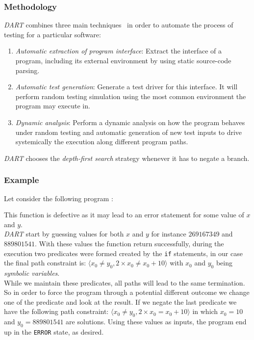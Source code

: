 \documentclass[11pt, conference]{IEEEtran}
\begin{document}
    	\subsubsection{Methodology}
	    	\emph{DART} combines three main techniques~\cite{godefroid2005dart} in order to automate the process of testing for a particular software:
	    	\begin{enumerate}
	    		\item \emph{Automatic extraction of program interface}: Extract the interface of a program, including its external environment by using static source-code parsing.
	    		\item \emph{Automatic test generation}: Generate a test driver for this interface. It will perform random testing simulation using the most common environment the program may execute in.
	    		\item \emph{Dynamic analysis}: Perform a dynamic analysis on how the program behaves under random testing and automatic generation of new test inputs to drive systemically the execution along different program paths.
	    	\end{enumerate}

			\emph{DART} chooses the \emph{depth-first search} strategy whenever it has to negate a branch.

	    \subsubsection{Example}
		    Let consider the following program :

		    \begin{algorithm}


		    \end{algorithm}

	    	This function is defective as it may lead to an error statement for some value of $x$ and $y$.\\
	    	\emph{DART} start by guessing values for both $x$ and $y$ for instance $269167349$ and $889801541$. With these values the function return  successfully, during the execution two predicates were formed created by the \texttt{if} statements, in our case the final path constraint is: $\langle x_0 \neq y_0, 2 \times x_0 \neq x_0 + 10 \rangle$ with $x_0$ and $y_0$ being \emph{symbolic variables}.\\
	    	While we maintain these predicates, all paths will lead to the same termination. So in order to force the program through a potential different outcome we change one of the predicate and look at the result. If we negate the last predicate we have the following path constraint: $\langle x_0 \neq y_0, 2 \times x_0 = x_0 + 10 \rangle$ in which $x_0=10$ and $y_0=889801541$ are solutions. Using these values as inputs, the program end up in the \texttt{ERROR} state, as desired.
\end{document}
